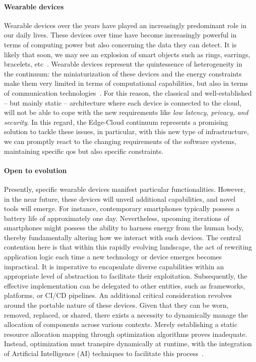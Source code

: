 \documentclass[12pt,a4paper]{article}
\begin{document}
\paragraph{Wearable devices}
Wearable devices over the years have played an increasingly predominant role in our daily lives.
These devices over time have become increasingly powerful in terms of computing power but also concerning the data they can detect.
%
It is likely that soon,
we may see an explosion of smart objects such as rings,
earrings, bracelets, etc~\cite{DBLP:conf/islped/BasaklarTAO21}.
%
Wearable devices represent the quintessence of heterogeneity in the continuum:
the miniaturization of these devices and the energy constraints make them very limited in terms of computational capabilities,
but also in terms of communication technologies~\cite{DBLP:journals/fteda/YinAMJ18, DBLP:journals/dt/BhatDO19}.
%
For this reason,
the classical and well-established -- but mainly static -- architecture where each device is connected to the cloud,
will not be able to cope with the new requirements like \emph{low latency, privacy, and security}.
%
In this regard,
the Edge-Cloud continuum represents a promising solution to tackle these issues,
in particular,
with this new type of infrastructure,
we can promptly react to the changing requirements of the software systems,
maintaining specific \ac{qos} but also specific constraints.

\paragraph{Open to evolution}
Presently,
specific wearable devices manifest particular functionalities.
%
However,
in the near future,
these devices will unveil additional capabilities,
and novel tools will emerge.
%
For instance,
contemporary smartphones typically possess a battery life of approximately one day.
%
Nevertheless,
upcoming iterations of smartphones might possess the ability to harness energy from the human body,
thereby fundamentally altering how we interact with such devices.
%
The central contention here is that within this rapidly evolving landscape,
the act of rewriting application logic each time a new technology or device emerges becomes impractical.
%
It is imperative to encapsulate diverse capabilities within an appropriate level of abstraction to facilitate their exploitation.
%
Subsequently,
the effective implementation can be delegated to other entities,
such as frameworks, platforms, or CI/CD pipelines.
%
An additional critical consideration revolves around the portable nature of these devices.
Given that they can be worn, removed, replaced, or shared,
there exists a necessity to dynamically manage the allocation of components across various contexts.
%
Merely establishing a static resource allocation mapping through optimization algorithms proves inadequate.
%
Instead,
optimization must transpire dynamically at runtime,
with the integration of Artificial Intelligence (AI) techniques to facilitate this process~\cite{DBLP:journals/computing/ShahidaniGHK23}.
\end{document}
